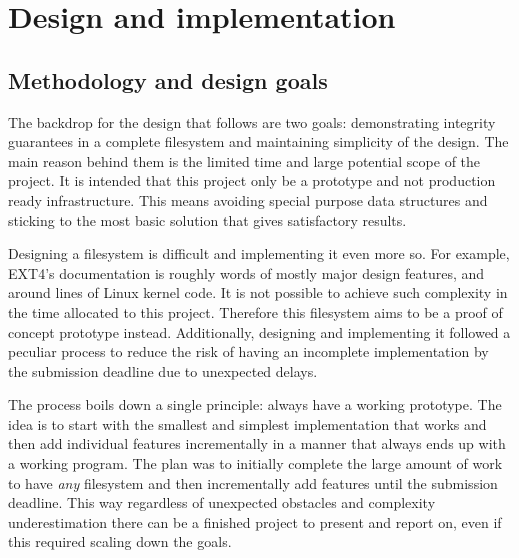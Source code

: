 \chapter{Design and implementation}
    \label{ch:design}

    \section{Methodology and design goals}
        \label{sec:methodology}


        The backdrop for the design that follows are two goals: demonstrating
        integrity guarantees in a complete filesystem and maintaining
        simplicity of the design. The main reason behind them is the limited
        time and large potential scope of the project. It is intended that this
        project only be a prototype and not production ready infrastructure.
        This means avoiding special purpose data structures and sticking to the
        most basic solution that gives satisfactory results.

        Designing a filesystem is difficult and implementing it even more so.
        For example, EXT4's documentation \cite{ext4_docs} is roughly
         words of mostly major design features, and around
         lines of Linux kernel code. It is not possible to
        achieve such complexity in the time allocated to this project.
        Therefore this filesystem aims to be a proof of concept prototype
        instead. Additionally, designing and implementing it followed a
        peculiar process to reduce the risk of having an incomplete
        implementation by the submission deadline due to unexpected delays.

        The process boils down a single principle: always have a working
        prototype. The idea is to start with the smallest and simplest
        implementation that works and then add individual features
        incrementally in a manner that always ends up with a working program.
        The plan was to initially complete the large amount of work to have
        \textit{any} filesystem and then incrementally add features until the
        submission deadline. This way regardless of unexpected obstacles and
        complexity underestimation there can be a finished project to present
        and report on, even if this required scaling down the goals.



